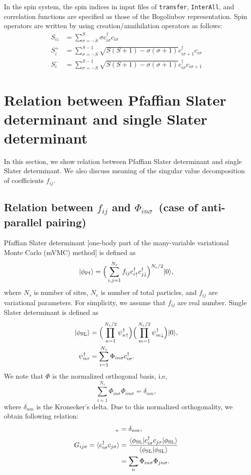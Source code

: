 In the spin system,
the spin indices in input files of \verb|transfer|, \verb|InterAll|,
and correlation functions are specified as those of the Bogoliubov representation.
Spin operators are written by using creation/annihilation operators as follows:
\begin{align}
  S_{i z} &= \sum_{\sigma = -S}^{S} \sigma c_{i \sigma}^\dagger c_{i \sigma}
  \\
  S_{i}^+ &= \sum_{\sigma = -S}^{S-1} 
  \sqrt{S(S+1) - \sigma(\sigma+1)} 
  c_{i \sigma+1}^\dagger c_{i \sigma}
  \\
  S_{i}^- &= \sum_{\sigma = -S}^{S-1} 
  \sqrt{S(S+1) - \sigma(\sigma+1)} 
  c_{i \sigma}^\dagger c_{i \sigma+1}
\end{align}

\section{Relation between Pfaffian Slater determinant and single Slater determinant}
\label{sec:PuffAndSlater}
In this section, we show relation between Pfaffian Slater determinant and single Slater determinant.
We also discuss meaning of the singular value decomposition of coefficients $f_{ij}$. 
\subsection{Relation between $f_{ij}$ and $\Phi_{in\sigma}$~(case of anti-parallel pairing)}
Pfaffian Slater determinant [one-body part of the many-variable variational Monte Carlo (mVMC) method]
is defined as
\begin{equation}
|\phi_{\rm Pf}\rangle=\Big(\sum_{i,j=1}^{N_{s}}f_{ij}c_{i\uparrow}^{\dagger}c_{j\downarrow}^{\dagger}\Big)^{N_{\rm e}/2}|0\rangle,
\end{equation}
where $N_{s}$ is number of sites, 
$N_{e}$ is number of total particles,
and $f_{ij}$ are variational parameters.
For simplicity, we assume that $f_{ij}$ are real number.
Single Slater determinant is defined as 
\begin{align}
|\phi_{\rm SL}\rangle&=\Big(\prod_{n=1}^{N_{e}/2}\psi_{n\uparrow}^{\dagger}\Big)
\Big(\prod_{m=1}^{N_{e}/2}\psi_{m\downarrow}^{\dagger}\Big)|0\rangle, \\
\psi_{n\sigma}^{\dagger}&=\sum_{i=1}^{N_{s}}\Phi_{in\sigma}c^{\dagger}_{i\sigma}.
\end{align}
We note that $\Phi$ is the normalized orthogonal basis, i.e, 
\begin{equation}
\sum_{i=1}^{N_{s}}\Phi_{in\sigma}\Phi_{im\sigma}=\delta_{nm},
\end{equation}
where $\delta_{nm}$ is the Kronecker's delta.
Due to this normalized orthogonality, we obtain 
following relation:
\begin{align}
[\psi^{\dagger}_{n\sigma},\psi_{m\sigma}]_{+}&=\delta_{nm},\\
G_{ij\sigma}=\langle c_{i\sigma}^{\dagger}c_{j\sigma}\rangle 
&=\frac{\langle \phi_{\rm SL}| c_{i\sigma}^{\dagger}c_{j\sigma} | \phi_{\rm SL}\rangle}{\langle \phi_{\rm SL}|\phi_{\rm SL}\rangle } \\
&=\sum_{n} \Phi_{in\sigma} \Phi_{jn\sigma}.
\end{align}

